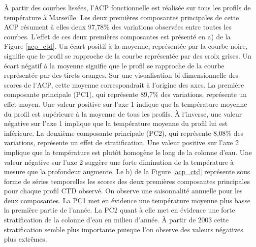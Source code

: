 \documentclass[12pt]{article}
\begin{document}
À partir des courbes lissées, l’ACP fonctionnelle est réalisée sur tous les profils de température à Marseille.  Les deux premières composantes principales de cette ACP résument à elles deux 97,78\% des variations observées entre toutes les courbes. L’effet de ces deux premières composantes est présenté en a) de la Figure \ref{acp_ctd}. Un écart positif à la moyenne, représentée par la courbe noire, signifie que le profil se rapproche de la courbe représentée par des croix grises. Un écart négatif à la moyenne signifie que le profil se rapproche de la courbe représentée par des tirets oranges. Sur une visualisation bi-dimensionnelle des scores de l’ACP, cette moyenne correspondrait à l’origine des axes. La première composante principale (PC1), qui représente 89,7\% des variations, représente un effet moyen. Une valeur positive sur l’axe 1 indique que la température moyenne du profil est supérieure à la moyenne de tous les profils. À l’inverse, une valeur négative sur l’axe 1 implique que la température moyenne du profil lui est inférieure. La deuxième composante principale (PC2), qui représente 8,08\% des variations, représente un effet de stratification. Une valeur positive sur l’axe 2 implique que la température est plutôt homogène le long de la colonne d’eau. Une valeur négative sur l’axe 2 suggère une forte diminution de la température à mesure que la profondeur augmente. Le b) de la Figure \ref{acp_ctd} représente sous forme de séries temporelles les scores des deux premières composantes principales pour chaque profil CTD observé. On observe une saisonnalité annuelle pour les deux composantes. La PC1 met en évidence une température moyenne plus basse la première partie de l’année. La PC2 quant à elle met en évidence une forte stratification de la colonne d’eau en milieu d’année. À partir de 2003 cette stratification semble plus importante puisque l'on observe des valeurs négatives plus extrêmes. 
\end{document}
